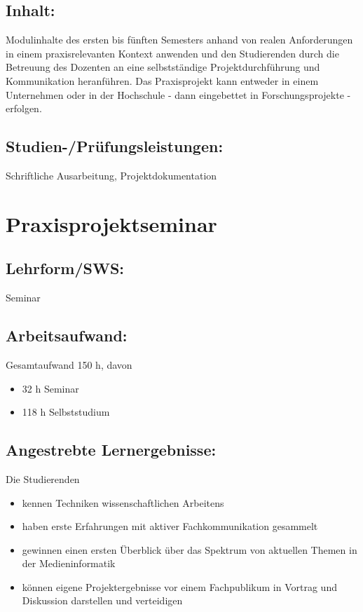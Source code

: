 \section*{Inhalt:}\label{inhalt-18}

Modulinhalte des ersten bis fünften Semesters anhand von realen
Anforderungen in einem praxisrelevanten Kontext anwenden und den
Studierenden durch die Betreuung des Dozenten an eine selbstständige
Projektdurchführung und Kommunikation heranführen. Das Praxisprojekt
kann entweder in einem Unternehmen oder in der Hochschule - dann
eingebettet in Forschungsprojekte - erfolgen.

\section*{Studien-/Prüfungsleistungen:}\label{studien-pruxfcfungsleistungen-13}

Schriftliche Ausarbeitung, Projektdokumentation

\chapter{Praxisprojektseminar}\label{praxisprojektseminar}

\section*{Lehrform/SWS:}\label{lehrformsws-15}

Seminar

\section*{Arbeitsaufwand:}\label{arbeitsaufwand-12}

Gesamtaufwand 150 h, davon

\begin{itemize}
\item
  32 h Seminar
\item
  118 h Selbststudium
\end{itemize}

\section*{Angestrebte
Lernergebnisse:}\label{angestrebte-lernergebnisse-19}

Die Studierenden

\begin{itemize}
\item
  kennen Techniken wissenschaftlichen Arbeitens
\item
  haben erste Erfahrungen mit aktiver Fachkommunikation gesammelt
\item
  gewinnen einen ersten Überblick über das Spektrum von aktuellen Themen
  in der Medieninformatik
\item
  können eigene Projektergebnisse vor einem Fachpublikum in Vortrag und
  Diskussion darstellen und verteidigen
\end{itemize}

